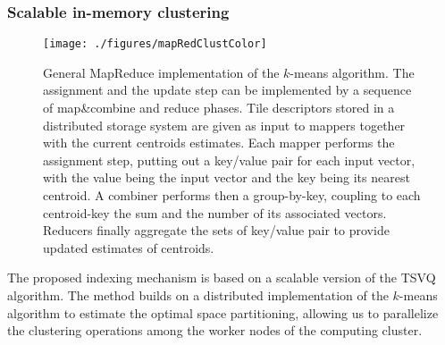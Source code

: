 \subsubsection{Scalable in-memory clustering}
\label{sec:inmem_clustering}

\begin{figure*}[t]
	\centering
\texttt{[image: ./figures/mapRedClustColor]}
	\caption{General MapReduce implementation of the \mbox{$k$-means} algorithm. The assignment and the update step can be implemented by a sequence of map\&combine and reduce phases. Tile descriptors stored in a distributed storage system are given as input to mappers together with the current centroids estimates. Each mapper performs the assignment step, putting out a key/value pair for each input vector, with the value being the input vector and the key being its nearest centroid. A combiner performs then a group-by-key, coupling to each centroid-key the sum and the number of its associated vectors. Reducers finally aggregate the sets of key/value pair to provide updated estimates of centroids.}
	\label{fig:mapRedClust}
\end{figure*}


The proposed indexing mechanism is based on a scalable version of the TSVQ algorithm. 
The method builds on a distributed implementation of the \mbox{$k$-means} algorithm to estimate the optimal space partitioning, allowing us to parallelize the clustering operations among the worker nodes of the computing cluster. 


